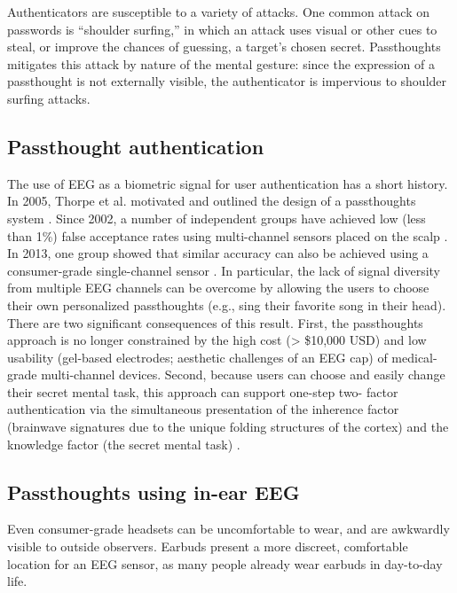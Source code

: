 \documentclass[sigconf]{acmart}
\begin{document}
Authenticators are susceptible to a variety of attacks. 
One common attack on passwords is ``shoulder surfing,'' in which an attack uses visual or other cues to steal, or improve the chances of guessing, a target's chosen secret. 
Passthoughts mitigates this attack by nature of the mental gesture:
since the expression of a passthought is not externally visible, the authenticator is impervious to shoulder surfing attacks.

\subsection{Passthought authentication}
\label{sec:orgd5b852d}

The use of EEG as a biometric signal for user authentication has a short history.
In 2005, Thorpe et al. motivated and outlined the design of a passthoughts system \cite{Thorpe2005}. Since 2002, a number of independent groups have achieved low (less than 1\%) false acceptance rates using multi-channel sensors placed on the scalp \cite{Poulos2002,Marcel2007a,Palaniappan2008,Ashby2011}.
In 2013, one group showed that similar accuracy can also be
achieved using a consumer-grade single-channel sensor \cite{Chuang2013b}. 
In particular, the lack of signal diversity from multiple EEG channels can be overcome by allowing
the users to choose their own personalized passthoughts (e.g., sing their favorite
song in their head). There are two significant consequences of this result. First,
the passthoughts approach is no longer constrained by the high cost (> \$10,000 USD)
and low usability (gel-based electrodes; aesthetic challenges of an EEG cap) of
medical-grade multi-channel devices. Second, because users can choose and
easily change their secret mental task, this approach can support one-step two-
factor authentication via the simultaneous presentation of the inherence factor
(brainwave signatures due to the unique folding structures of the cortex) and the
knowledge factor (the secret mental task) \cite{Chuang2014}.

\subsection{Passthoughts using in-ear EEG}
\label{sec:orgff60346}

Even consumer-grade headsets can be uncomfortable to wear, and are awkwardly visible to outside observers. Earbuds present a more discreet, comfortable location for an EEG sensor, as many people already wear earbuds in day-to-day life.
\end{document}
